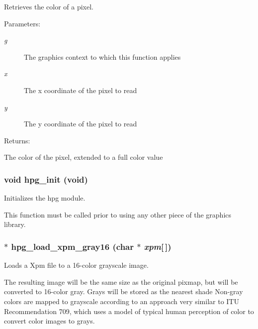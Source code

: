 Retrieves the color of a pixel.

\begin{Desc}
\item[Parameters: ]\par
\begin{description}
\item[{\em 
g}]The graphics context to which this function applies \item[{\em 
x}]The x coordinate of the pixel to read \item[{\em 
y}]The y coordinate of the pixel to read \end{description}
\end{Desc}
\begin{Desc}
\item[Returns: ]\par
The color of the pixel, extended to a full color value \end{Desc}
\subsubsection{\setlength{\rightskip}{0pt plus 5cm}void hpg\_\-init (void)}\label{hpgraphics_8h_a28}


Initializes the hpg module.

This function must be called prior to using any other piece of the graphics library. 
\subsubsection{$\ast$ hpg\_\-load\_\-xpm\_\-gray16 (char $\ast$ {\em xpm}[$\,$])}\label{hpgraphics_8h_a82}


Loads a Xpm file to a 16-color grayscale image.

The resulting image will be the same size as the original pixmap, but will be converted to 16-color gray. Grays will be stored as the nearest shade Non-gray colors are mapped to grayscale according to an approach very similar to ITU Recommendation 709, which uses a model of typical human perception of color to convert color images to grays.

